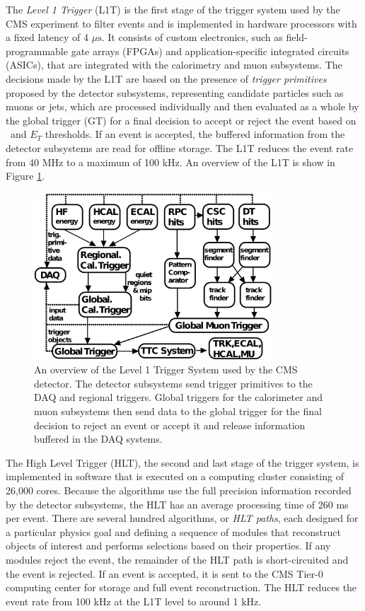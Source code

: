 The \textit{Level 1 Trigger} (L1T) is the first stage of the trigger system used by the CMS experiment to filter events and is implemented in hardware processors with a fixed latency of 4 $\mu\mathrm{s}$. It consists of custom electronics, such as field-programmable gate arrays (FPGAs) and application-specific integrated circuits (ASICs), that are integrated with the calorimetry and muon subsystems. The decisions made by the L1T are based on the presence of \textit{trigger primitives} proposed by the detector subsystems, representing candidate particles such as muons or jets, which are processed individually and then evaluated as a whole by the global trigger (GT) for a final decision to accept or reject the event based on \pT\ and $E_{T}$ thresholds. If an event is accepted, the buffered information from the detector subsystems are read for offline storage. The L1T reduces the event rate from 40 MHz to a maximum of 100 kHz. An overview of the L1T is show in Figure \ref{fig:CMSL1T}.

\begin{figure}[htbp]
  \centering
    \includegraphics[width=3.5in]{images/l1t_overview}
    \caption[Overview of the Level 1 Trigger System]{An overview of the Level 1 Trigger System used by the CMS detector. The detector subsystems send trigger primitives to the DAQ and regional triggers. Global triggers for the calorimeter and muon subsystems then send data to the global trigger for the final decision to reject an event or accept it and release information buffered in the DAQ systems.\cite{CMSTRIDAS}}
    \label{fig:CMSL1T}
\end{figure}

The High Level Trigger (HLT), the second and last stage of the trigger system, is implemented in software that is executed on a computing cluster consisting of 26,000 cores. Because the algorithms use the full precision information recorded by the detector subsystems, the HLT has an average processing time of 260 ms per event.\cite{CMSHLT} There are several hundred algorithms, or \textit{HLT paths}, each designed for a particular physics goal and defining a sequence of modules that reconstruct objects of interest and performs selections based on their properties. If any modules reject the event, the remainder of the HLT path is short-circuited and the event is rejected. If an event is accepted, it is sent to the CMS Tier-0 computing center for storage and full event reconstruction. The HLT reduces the event rate from 100 kHz at the L1T level to around 1 kHz.

